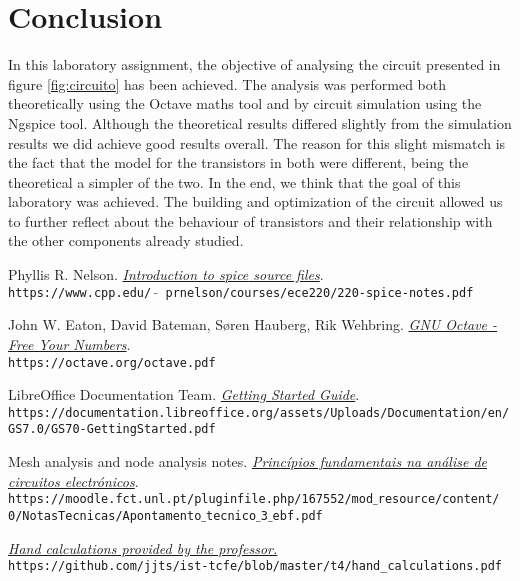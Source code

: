 \clearpage

\section{Conclusion}
\label{sec:conclusion}

In this laboratory assignment, the objective of analysing the circuit presented
in figure \ref{fig:circuito} has been achieved. The analysis was performed both theoretically
using the Octave maths tool and by circuit simulation using the Ngspice tool.
Although the theoretical results differed slightly from the simulation results we did achieve good results overall.
The reason for this slight mismatch is the fact that the model for the transistors
in both were different, being the theoretical a simpler of the two.
In the end, we think that the goal of this laboratory was achieved. The building and optimization
of the circuit allowed us to further reflect about the behaviour of transistors and their relationship with the other components already studied.


\begin{thebibliography}{9}

    Phyllis R. Nelson.
    \textit{\href{https://www.cpp.edu/~prnelson/courses/ece220/220-spice-notes.pdf}{Introduction to \emph{spice} source files}}.
    \\\texttt{https://www.cpp.edu/ $\tilde{}$ prnelson/courses/ece220/220-spice-notes.pdf}


    John W. Eaton, David Bateman, Søren Hauberg, Rik Wehbring.
    \textit{\href{https://octave.org/octave.pdf}{GNU Octave - Free Your Numbers}}.
    \\\texttt{https://octave.org/octave.pdf}

    LibreOffice Documentation Team.
    \textit{\href{https://documentation.libreoffice.org/assets/Uploads/Documentation/en/GS7.0/GS70-GettingStarted.pdf}{Getting Started Guide}}.
    \\\texttt{https://documentation.libreoffice.org/assets/Uploads/Documentation/en/
        GS7.0/GS70-GettingStarted.pdf}

    Mesh analysis and node analysis notes.
    \textit{\href{https://moodle.fct.unl.pt/pluginfile.php/167552/mod_resource/content/0/NotasTecnicas/Apontamento_tecnico_3_ebf.pdf}{Princípios fundamentais na análise de circuitos electrónicos}}.
    \\\texttt{https://moodle.fct.unl.pt/pluginfile.php/167552/mod$\_$resource/content/
        0/NotasTecnicas/Apontamento$\_$tecnico$\_$3$\_$ebf.pdf}

    \textit{\href{https://github.com/jjts/ist-tcfe/blob/master/t4/hand_calculations.pdf}{
            Hand calculations provided by the professor.}}
    \\\texttt{https://github.com/jjts/ist-tcfe/blob/master/t4/hand\_calculations.pdf}
\end{thebibliography}